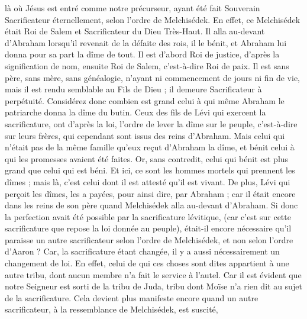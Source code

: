 \begin{multicols}{2}
là où Jésus est entré comme notre précurseur, ayant été fait Souverain Sacrificateur éternellement, selon l'ordre de Melchisédek.
\VerseOne{}En effet, ce Melchisédek était Roi de Salem et Sacrificateur du Dieu Très-Haut. Il alla au-devant d'Abraham lorsqu'il revenait de la défaite des rois, il le bénit,
et Abraham lui donna pour sa part la dîme de tout. Il est d’abord Roi de justice, d’après la signification de nom, ensuite Roi de Salem, c’est-à-dire Roi de paix.
Il est sans père, sans mère, sans généalogie, n'ayant ni commencement de jours ni fin de vie, mais il est rendu semblable au Fils de Dieu ; il demeure Sacrificateur à perpétuité.
Considérez donc combien est grand celui à qui même Abraham le patriarche donna la dîme du butin.
Ceux des fils de Lévi qui exercent la sacrificature, ont d’après la loi, l’ordre de lever la dîme sur le peuple, c'est-à-dire sur leurs frères, qui cependant sont issus des reins d'Abraham.
Mais celui qui n’était pas de la même famille qu’eux reçut d’Abraham la dîme, et bénit celui à qui les promesses avaient été faites.
Or, sans contredit, celui qui bénit est plus grand que celui qui est béni.
Et ici, ce sont les hommes mortels qui prennent les dîmes ; mais là, c’est celui dont il est attesté qu’il est vivant.
De plus, Lévi qui perçoit les dîmes, les a payées, pour ainsi dire, par Abraham ;
car il était encore dans les reins de son père quand Melchisédek alla au-devant d’Abraham.
Si donc la perfection avait été possible par la sacrificature lévitique, (car c'est sur cette sacrificature que repose la loi donnée au peuple), était-il encore nécessaire qu’il paraisse un autre sacrificateur selon l'ordre de Melchisédek, et non selon l'ordre d'Aaron ?
Car, la sacrificature étant changée, il y a aussi nécessairement un changement de loi.
En effet, celui de qui ces choses sont dites appartient à une autre tribu, dont aucun membre n'a fait le service à l'autel.
Car il est évident que notre Seigneur est sorti de la tribu de Juda, tribu dont Moïse n'a rien dit au sujet de la sacrificature.
Cela devient plus manifeste encore quand un autre sacrificateur, à la ressemblance de Melchisédek, est suscité,

\end{multicols}
